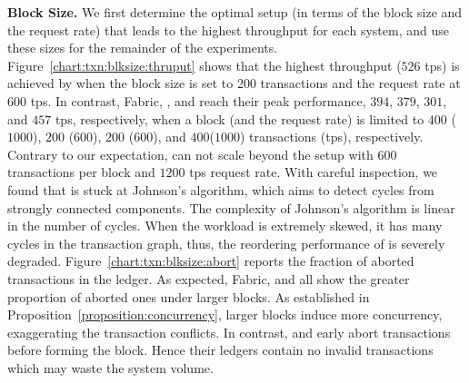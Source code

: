 \textbf{Block Size.}
We first determine the optimal setup (in terms of the block size and the request rate) that leads to the highest throughput for each system, and use these sizes for the remainder of the experiments.
Figure~\ref{chart:txn:blksize:thruput} shows that the highest throughput ($526$ tps) is achieved by {\fsF} when the block size is set to 200 transactions and the request rate at $600$ tps. 
In contrast, Fabric, {\fsP}, {\fsS} and {\fsL} reach their peak performance, $394$, $379$, $301$, and $457$ tps, respectively, when a block (and the request rate) is limited to $400$ ($1000$), $200$ ($600$), $200$ ($600$), and $400$($1000$) transactions (tps), respectively. 
Contrary to our expectation, {\fsP} can not scale beyond the setup with $600$ transactions per block and $1200$ tps request rate. 
With careful inspection, we found that {\fsP} is stuck at Johnson's algorithm, which aims to detect cycles from strongly connected components. 
The complexity of Johnson's algorithm is linear in the number of cycles. 
When the workload is extremely skewed, it has many cycles in the transaction graph, thus, the reordering performance of {\fsP} is severely degraded. 
Figure~\ref{chart:txn:blksize:abort} reports the fraction of aborted transactions in the ledger. 
As expected, Fabric, {\fsP} and {\fsL} all show the greater proportion of aborted ones under larger blocks. 
As established in Proposition~\ref{proposition:concurrency}, larger blocks induce more concurrency, exaggerating the transaction conflicts. 
In contrast, {\fsS} and {\fsF} early abort transactions before forming the block. Hence their ledgers contain no invalid transactions which may waste the system volume. 


